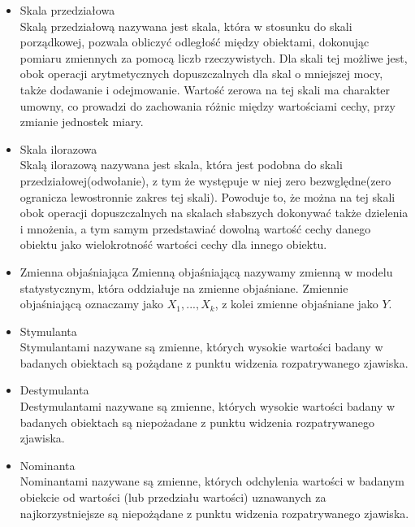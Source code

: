 \documentclass[12pt,a4paper]{report}
\begin{document}
\begin{itemize}
\item Skala przedziałowa \cite[Rozdział 1.2]{panek2013}\\
Skalą przedziałową nazywana jest skala, która w stosunku do skali porządkowej, pozwala obliczyć odległość między obiektami, dokonując pomiaru zmiennych za pomocą liczb rzeczywistych. Dla skali tej możliwe jest, obok operacji arytmetycznych dopuszczalnych dla skal o mniejszej mocy, także dodawanie i odejmowanie. Wartość zerowa na tej skali ma charakter umowny, co prowadzi do zachowania różnic między wartościami cechy, przy zmianie jednostek miary. \\

\item Skala ilorazowa \cite[Rozdział 1.2]{panek2013}\\
Skalą ilorazową nazywana jest skala, która jest podobna do skali przedziałowej(odwołanie), z tym że występuje w niej zero bezwględne(zero ogranicza lewostronnie zakres tej skali). Powoduje to, że można na tej skali obok operacji dopuszczalnych na skalach słabszych dokonywać także dzielenia i mnożenia, a tym samym przedstawiać dowolną wartość cechy danego obiektu jako wielokrotność wartości cechy dla innego obiektu.\\

\item Zmienna objaśniająca \cite[Rozdział 1.1] {grabinski1982}
Zmienną objaśniającą nazywamy zmienną w modelu statystycznym, która oddziałuje na zmienne objaśniane. Zmiennie  objaśniającą oznaczamy jako $X_{1}, ..., X_{k}$, z kolei zmienne objaśniane jako $Y$. \\

\item Stymulanta \cite[Rozdział 1.5]{panek2013}\\
Stymulantami nazywane są zmienne, których wysokie wartości badany w badanych obiektach są pożądane z punktu widzenia rozpatrywanego zjawiska.\\

\item Destymulanta \cite[Rozdział 1.5]{panek2013}\\
Destymulantami nazywane są zmienne, których wysokie wartości badany w badanych obiektach są niepożadane z punktu widzenia rozpatrywanego zjawiska.\\

\item Nominanta \cite[Rozdział 1.5]{panek2013}\\
Nominantami nazywane są zmienne, których odchylenia wartości w badanym obiekcie od wartości (lub przedziału wartości) uznawanych za najkorzystniejsze są niepożądane z punktu widzenia rozpatrywanego zjawiska.\\


\end{itemize}
\end{document}
